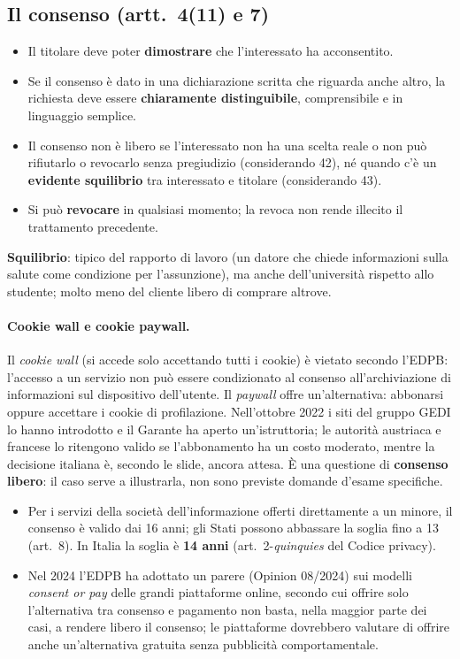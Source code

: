 \subsection{Il consenso (artt.~4(11) e 7)}
\begin{itemize}
  \item Il titolare deve poter \textbf{dimostrare} che l'interessato ha acconsentito.
  \item Se il consenso è dato in una dichiarazione scritta che riguarda anche altro, la richiesta deve
    essere \textbf{chiaramente distinguibile}, comprensibile e in linguaggio semplice.
  \item Il consenso non è libero se l'interessato non ha una scelta reale o non può rifiutarlo o
    revocarlo senza pregiudizio (considerando 42), né quando c'è un \textbf{evidente squilibrio} tra
    interessato e titolare (considerando 43).
  \item Si può \textbf{revocare} in qualsiasi momento; la revoca non rende illecito il trattamento
    precedente.
\end{itemize}
\textbf{Squilibrio}: tipico del rapporto di lavoro (un datore che chiede informazioni sulla salute come
condizione per l'assunzione), ma anche dell'università rispetto allo studente; molto meno del cliente
libero di comprare altrove.

\paragraph{Cookie wall e cookie paywall.} Il \emph{cookie wall} (si accede solo accettando tutti i
cookie) è vietato secondo l'EDPB: l'accesso a un servizio non può essere condizionato al consenso
all'archiviazione di informazioni sul dispositivo dell'utente. Il \emph{paywall} offre un'alternativa:
abbonarsi oppure accettare i cookie di profilazione. Nell'ottobre 2022 i siti del gruppo GEDI lo hanno
introdotto e il Garante ha aperto un'istruttoria; le autorità austriaca e francese lo ritengono valido se
l'abbonamento ha un costo moderato, mentre la decisione italiana è, secondo le slide, ancora attesa. È
una questione di \textbf{consenso libero}: il caso serve a illustrarla, non sono previste domande
d'esame specifiche.

\begin{integrazione}
\begin{itemize}
  \item Per i servizi della società dell'informazione offerti direttamente a un minore, il consenso è
    valido dai 16 anni; gli Stati possono abbassare la soglia fino a 13 (art.~8). In Italia la soglia è
    \textbf{14 anni} (art.~2-\emph{quinquies} del Codice privacy).
  \item Nel 2024 l'EDPB ha adottato un parere (Opinion 08/2024) sui modelli \emph{consent or pay} delle
    grandi piattaforme online, secondo cui offrire solo l'alternativa tra consenso e pagamento non
    basta, nella maggior parte dei casi, a rendere libero il consenso; le piattaforme dovrebbero valutare
    di offrire anche un'alternativa gratuita senza pubblicità comportamentale.
\end{itemize}
\end{integrazione}

